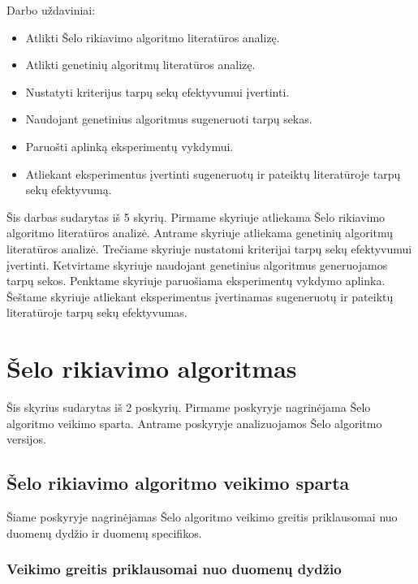 \documentclass{VUMIFInfKursinis}
\begin{document}
Darbo uždaviniai:
\begin{itemize}
  \item Atlikti Šelo rikiavimo algoritmo literatūros analizę.
  \item Atlikti genetinių algoritmų literatūros analizę.
  \item Nustatyti kriterijus tarpų sekų efektyvumui įvertinti.
  \item Naudojant genetinius algoritmus sugeneruoti tarpų sekas.
  \item Paruošti aplinką eksperimentų vykdymui.
  \item Atliekant eksperimentus įvertinti sugeneruotų ir pateiktų literatūroje tarpų sekų efektyvumą.
\end{itemize}

Šis darbas sudarytas iš 5 skyrių.
Pirmame skyriuje atliekama Šelo rikiavimo algoritmo literatūros analizė.
Antrame skyriuje atliekama genetinių algoritmų literatūros analizė.
Trečiame skyriuje nustatomi kriterijai tarpų sekų efektyvumui įvertinti.
Ketvirtame skyriuje naudojant genetinius algoritmus generuojamos tarpų sekos.
Penktame skyriuje paruošiama eksperimentų vykdymo aplinka.
Šeštame skyriuje atliekant eksperimentus įvertinamas sugeneruotų ir pateiktų literatūroje tarpų sekų efektyvumas.

\section{Šelo rikiavimo algoritmas}

Šis skyrius sudarytas iš 2 poskyrių.
Pirmame poskyryje nagrinėjama Šelo algoritmo veikimo sparta.
Antrame poskyryje analizuojamos Šelo algoritmo versijos.

\subsection{Šelo rikiavimo algoritmo veikimo sparta}

Šiame poskyryje nagrinėjamas Šelo algoritmo veikimo greitis priklausomai nuo duomenų dydžio ir duomenų specifikos.

\subsubsection{Veikimo greitis priklausomai nuo duomenų dydžio}
\end{document}

